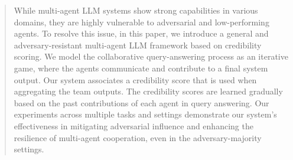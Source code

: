 \begin{abstract}
    While multi-agent LLM systems show strong capabilities in various domains, they are highly vulnerable to adversarial and low-performing agents.
    To resolve this issue, in this paper, we introduce a general and adversary-resistant multi-agent LLM framework based on credibility scoring.
    We model the collaborative query-answering process as an iterative game, where the agents communicate and contribute to a final system output.
    Our system associates a credibility score that is used when aggregating the team outputs. The credibility scores are learned gradually based on the past contributions of each agent in query answering.
    Our experiments across multiple tasks and settings demonstrate our system’s effectiveness in mitigating adversarial influence and enhancing the resilience of multi-agent cooperation, even in the adversary-majority settings.    
\end{abstract}